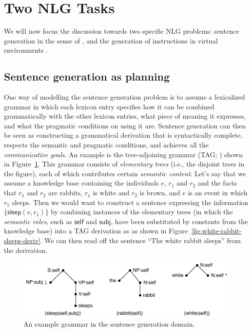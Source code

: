 \section{Two NLG Tasks}
\label{sec:domains}

We will now focus the discussion towards two specific NLG problems:
sentence generation in the sense of \cite{KolSto07}, and the
generation of instructions in virtual environments
\cite{ByrKolStrCasDalMooObe09}. 


\subsection{Sentence generation as planning}
\label{sec:domain-crisp}

One way of modelling the sentence generation problem is to assume a
lexicalized grammar in which each lexicon entry specifies how it can
be combined grammatically with the other lexicon entries, what piece
of meaning it expresses, and what the pragmatic conditions on using it
are. Sentence generation can then be seen as constructing a
grammatical derivation that is syntactically complete, respects the
semantic and pragmatic conditions, and achieves all the
\emph{communicative goals}. An example is the tree-adjoining grammar
(TAG; \citep{joshi;etal1997}) shown in
Figure~\ref{fig:white-rabbit-sleeps-grammar}. This grammar consists of
\emph{elementary trees} (i.e., the disjoint trees in the figure), each
of which contributes certain \emph{semantic content}. Let's say that
we assume a knowledge base containing the individuals $e$, $r_1$ and
$r_2$ and the facts that $r_1$ and $r_2$ are rabbits, $r_1$ is white
and $r_2$ is brown, and $e$ is an event in which $r_1$ sleeps. Then we
would want to construct a sentence expressing the information
$\{\mathsf{sleep}(e,r_1)\}$ by combining instances of the elementary
trees (in which the \emph{semantic roles}, such as $\mathsf{self}$ and
$\mathsf{subj}$, have been substituted by constants from the knowledge
base) into a TAG derivation as as shown in
Figure~\ref{fig:white-rabbit-sleeps-deriv}. We can then read off the
sentence ``The white rabbit sleeps'' from the derivation. 

\begin{figure}
  \centering
  \includegraphics[width=0.75\columnwidth]{pic-grammar}
  \caption{An example grammar in the sentence generation domain.}
  \label{fig:white-rabbit-sleeps-grammar}
\end{figure}


